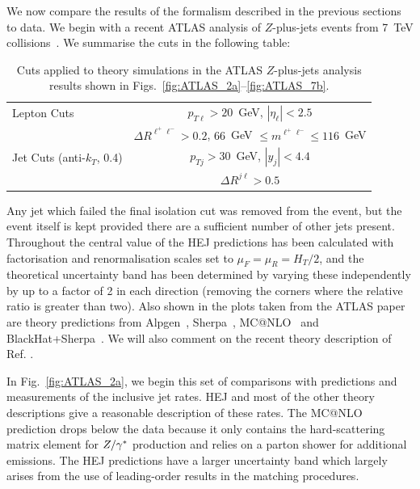 			We now compare the results of the formalism described in the previous sections
			to data.  We begin with a recent ATLAS analysis of $Z$-plus-jets events from
			7~TeV collisions~\cite{Aad:2013ysa}.  We summarise the cuts in the following
			table:

			\begin{table}[bth]
			  \centering
			  \begin{tabular}{|l|c|}
			    \hline
			    Lepton Cuts & $p_{T\ell}>20$~GeV, \; $|\eta_\ell|<2.5$ \\
			    & $\Delta R^{\ell^+\ell^-} > 0.2$, \; $66$~GeV $\leq m^{\ell^+\ell^-} \leq
			      116$~GeV \\ \hline
			    Jet Cuts (anti-$k_T$, 0.4) & $p_{Tj}>30$~GeV, \; $|y_j|<4.4$ \\
			    & $\Delta R^{j\ell} >0.5$ \\
			\hline
			  \end{tabular}
			  \caption{Cuts applied to theory simulations in the ATLAS
			    $Z$-plus-jets analysis results shown in Figs.~\eqref{fig:ATLAS_2a}--\eqref{fig:ATLAS_7b}.}
			  \label{tab:atlascuts}
			\end{table}

			Any jet which failed the final isolation cut was removed from the event, but the
			event itself is kept provided there are a sufficient number of other jets
			present.  Throughout the central value of the HEJ predictions has been
			calculated with factorisation and renormalisation scales set to
			$\mu_F=\mu_R=H_T/2$, and the theoretical uncertainty band has been determined by
			varying these independently by up to a factor of 2 in each direction (removing
			the corners where the relative ratio is greater than two).  Also shown in the
			plots taken from the ATLAS paper are theory predictions from
			Alpgen~\cite{Mangano:2002ea}, Sherpa~\cite{Gleisberg:2008ta,Hoeche:2012yf},
			MC@NLO~\cite{Frixione:2002ik} and
			BlackHat+Sherpa~\cite{Berger:2010vm,Ita:2011wn}.  We will also comment on the
			recent theory description of Ref.\cite{Frederix:2015eii} .

			In Fig.~\eqref{fig:ATLAS_2a}, we begin this set of comparisons with predictions
			and measurements of the inclusive jet rates.  HEJ and most of the other theory
			descriptions give a reasonable description of these rates.  The MC@NLO
			prediction drops below the data because it only contains the hard-scattering
			matrix element for $Z/\gamma^*$ production and relies on a parton shower for additional
			emissions. The HEJ predictions have a larger uncertainty band which largely
			arises from the use of leading-order results in the matching procedures.

